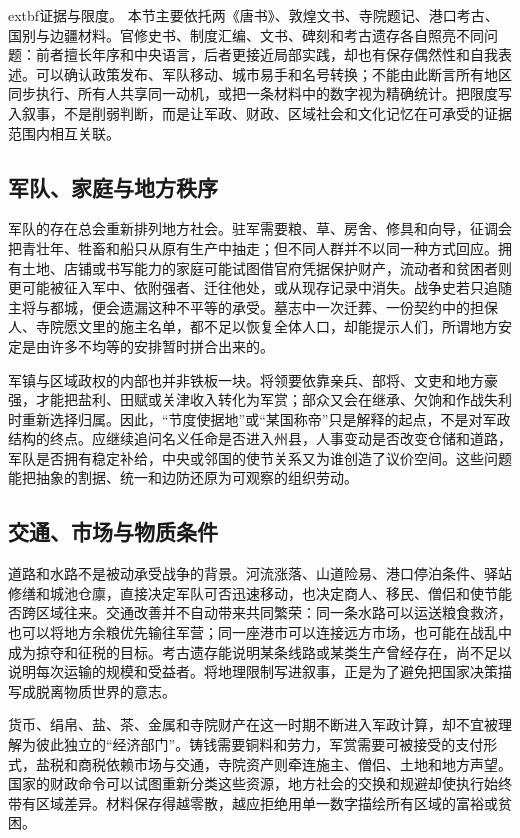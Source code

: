 \noindent	extbf{证据与限度。} 本节主要依托两《唐书》、敦煌文书、寺院题记、港口考古、国别与边疆材料。官修史书、制度汇编、文书、碑刻和考古遗存各自照亮不同问题：前者擅长年序和中央语言，后者更接近局部实践，却也有保存偶然性和自我表述。可以确认政策发布、军队移动、城市易手和名号转换；不能由此断言所有地区同步执行、所有人共享同一动机，或把一条材料中的数字视为精确统计。把限度写入叙事，不是削弱判断，而是让军政、财政、区域社会和文化记忆在可承受的证据范围内相互关联。

\subsection{军队、家庭与地方秩序}
军队的存在总会重新排列地方社会。驻军需要粮、草、房舍、修具和向导，征调会把青壮年、牲畜和船只从原有生产中抽走；但不同人群并不以同一种方式回应。拥有土地、店铺或书写能力的家庭可能试图借官府凭据保护财产，流动者和贫困者则更可能被征入军中、依附强者、迁往他处，或从现存记录中消失。战争史若只追随主将与都城，便会遗漏这种不平等的承受。墓志中一次迁葬、一份契约中的担保人、寺院愿文里的施主名单，都不足以恢复全体人口，却能提示人们，所谓地方安定是由许多不均等的安排暂时拼合出来的。

军镇与区域政权的内部也并非铁板一块。将领要依靠亲兵、部将、文吏和地方豪强，才能把盐利、田赋或关津收入转化为军赏；部众又会在继承、欠饷和作战失利时重新选择归属。因此，“节度使据地”或“某国称帝”只是解释的起点，不是对军政结构的终点。应继续追问名义任命是否进入州县，人事变动是否改变仓储和道路，军队是否拥有稳定补给，中央或邻国的使节关系又为谁创造了议价空间。这些问题能把抽象的割据、统一和边防还原为可观察的组织劳动。

\subsection{交通、市场与物质条件}
道路和水路不是被动承受战争的背景。河流涨落、山道险易、港口停泊条件、驿站修缮和城池仓廪，直接决定军队可否迅速移动，也决定商人、移民、僧侣和使节能否跨区域往来。交通改善并不自动带来共同繁荣：同一条水路可以运送粮食救济，也可以将地方余粮优先输往军营；同一座港市可以连接远方市场，也可能在战乱中成为掠夺和征税的目标。考古遗存能说明某条线路或某类生产曾经存在，尚不足以说明每次运输的规模和受益者。将地理限制写进叙事，正是为了避免把国家决策描写成脱离物质世界的意志。

货币、绢帛、盐、茶、金属和寺院财产在这一时期不断进入军政计算，却不宜被理解为彼此独立的“经济部门”。铸钱需要铜料和劳力，军赏需要可被接受的支付形式，盐税和商税依赖市场与交通，寺院资产则牵连施主、僧侣、土地和地方声望。国家的财政命令可以试图重新分类这些资源，地方社会的交换和规避却使执行始终带有区域差异。材料保存得越零散，越应拒绝用单一数字描绘所有区域的富裕或贫困。

